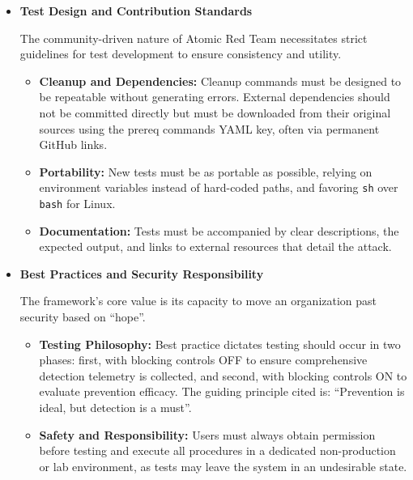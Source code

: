 \begin{itemize}
\begin{itemize}
\item \textbf{Specialized Validation Tools}
        \begin{itemize}
            \item \textbf{AtomicTestHarnesses:} A library (utilizing PowerShell and Python) crucial for validating the telemetry generated during execution. It is designed to stress test detection systems by running many variations of a single technique to evaluate the depth and fragility of security coverage.
            \item \textbf{Chain Reactor:} An open-source framework dedicated to composing executables that simulate adversary behaviors specifically on Linux endpoints. It uses easily configurable JSON input files.
        \end{itemize}
    \end{itemize}
    \item \textbf{Test Design and Contribution Standards}

The community-driven nature of Atomic Red Team necessitates strict guidelines for test development to ensure consistency and utility.

\begin{itemize}
    \item \textbf{Cleanup and Dependencies:} Cleanup commands must be designed to be repeatable without generating errors. External dependencies should not be committed directly but must be downloaded from their original sources using the prereq commands YAML key, often via permanent GitHub links.

    \item \textbf{Portability:} New tests must be as portable as possible, relying on environment variables instead of hard-coded paths, and favoring \texttt{sh} over \texttt{bash} for Linux.

    \item \textbf{Documentation:} Tests must be accompanied by clear descriptions, the expected output, and links to external resources that detail the attack.
\end{itemize}

    \item \textbf{Best Practices and Security Responsibility}

The framework's core value is its capacity to move an organization past security based on ``hope''.

\begin{itemize}
    \item \textbf{Testing Philosophy:} Best practice dictates testing should occur in two phases: first, with blocking controls OFF to ensure comprehensive detection telemetry is collected, and second, with blocking controls ON to evaluate prevention efficacy. The guiding principle cited is: ``Prevention is ideal, but detection is a must''.

    \item \textbf{Safety and Responsibility:} Users must always obtain permission before testing and execute all procedures in a dedicated non-production or lab environment, as tests may leave the system in an undesirable state.
    \end{itemize}
\end{itemize}
